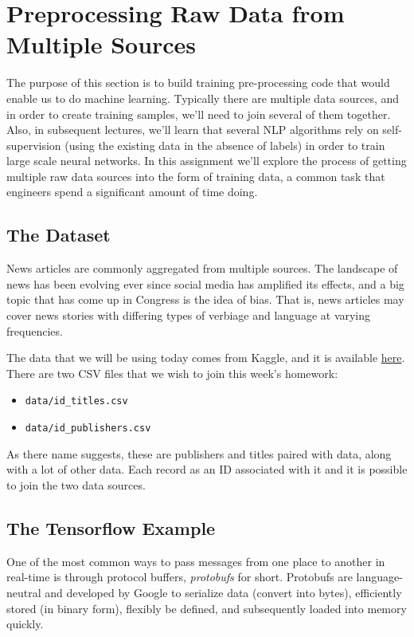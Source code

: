 \documentclass[paper=a4, fontsize=11pt]{scrartcl} %
\begin{document}
\maketitle %

\section{Preprocessing Raw Data from Multiple Sources}

The purpose of this section is to build training pre-processing code that would enable us to do machine learning. Typically there are multiple data sources, and in order to create training samples, we'll need to join several of them together. Also, in subsequent lectures, we'll learn that several NLP algorithms rely on self-supervision (using the existing data in the absence of labels) in order to train large scale neural networks. In this assignment we'll explore the process of getting multiple raw data sources into the form of training data, a common task that engineers spend a significant amount of time doing. 

\subsection{The Dataset}

News articles are commonly aggregated from multiple sources. The landscape of news has been evolving ever since social media has amplified its effects, and a big topic that has come up in Congress is the idea of bias. That is, news articles may cover news stories with differing types of verbiage and language at varying frequencies. 

The data that we will be using today comes from Kaggle, and it is available \href{https://course.ccs.neu.edu/cs6220/homework-3/}{here}. There are two CSV files that we wish to join this week's homework:

\begin{itemize}
    \item \verb"data/id_titles.csv"
    \item \verb"data/id_publishers.csv"
\end{itemize}

As there name suggests, these are publishers and titles paired with data, along with a lot of other data. Each record as an ID associated with it and it is possible to join the two data sources.

\subsection{The Tensorflow Example}
One of the most common ways to pass messages from one place to another in real-time is through protocol buffers, \emph{protobufs} for short. Protobufs are language-neutral and developed by Google to serialize data (convert into bytes), efficiently stored (in binary form), flexibly be defined, and subsequently loaded into memory quickly. 
\end{document}
